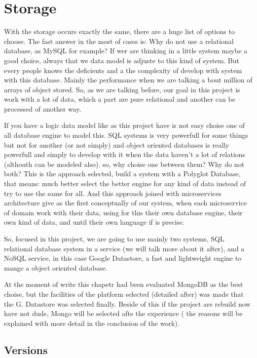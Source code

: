 \section{Storage}

With the storage occurs exactly the same, there are a huge list of options to
choose. The fast answer in the most of cases is: Why do not use a relational
database, as MySQL for example? If wer are thinking in a little system maybe a
good choice, always that we data model is adjuste to this kind of system. But
every people  knows the deficients and a the complexity of develop with system
with this database. Mainly the performance when we are talking a bout million
of arrays of object stored. So, as we are talking before, our goal in this project
is work with a lot of data, which a part are pure relational and another can be
processed of another way.

If you have a logic data model like as this project have is not easy choise one
of all database engine to model this. SQL systems is very powerfull for some
things but not for another (or not simply) and object oriented databases is
really powerfull and simply to develop with it when the data haven't a lot of
relations (althouth can be modeled also).
so, why choise one between them? Why do not both? This is the approach selected,
build a system with a Polyglot Database, that means: much better select the better
engine for any kind of data instead of try to use the same for all.
And this approach joined with microservices architecture give as the first
conceptually of our system, when each microservice of domain work with their
data, using for this their own database engine, their own kind of data, and
until their own language if is precise.


So, focused in this project, we are going to use mainly two systems, SQL
relational database system in a service (we will talk more about it after),
and a NoSQL service, in this case Google Datastore, a fast and lightweight
engine to mange a object oriented database.

At the moment of write this chapetr had been evaluated MongoDB as the best
choise, but the facilities of the platform selected (detailed after) was made
that the G. Datastore was selected finally. Beside of this if the project are
rebuild now have not dude, Mongo will be selected afte the experience ( the
reasons will be explained with more detail in the conclusion of the work).

\subsection{Versions}

